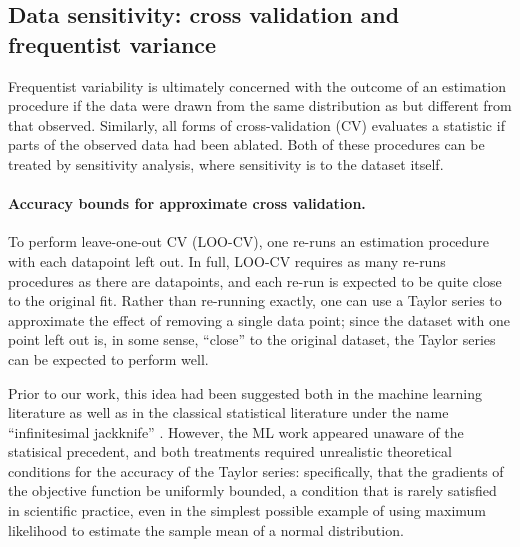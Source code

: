 

\subsection*{Data sensitivity: cross validation and frequentist variance}

Frequentist variability is ultimately concerned with the outcome of an
estimation procedure if the data were drawn from the same distribution as but
different from that observed.  Similarly, all forms of cross-validation (CV)
evaluates a statistic if parts of the observed data had been ablated.  Both of
these procedures can be treated by sensitivity analysis, where sensitivity
is to the dataset itself.

\paragraph{Accuracy bounds for approximate cross validation.}

To perform leave-one-out CV (LOO-CV), one re-runs an estimation procedure with
each datapoint left out.  In full, LOO-CV requires as many re-runs procedures as
there are datapoints, and each re-run is expected to be quite close to the
original fit.  Rather than re-running exactly, one can use a Taylor series to
approximate the effect of removing a single data point; since the dataset with
one point left out is, in some sense, ``close'' to the original dataset, the
Taylor series can be expected to perform well.

Prior to our work, this idea had been suggested both in the machine learning
literature \citep{rad:2018:scalableloo, koh:2017:blackbox} as well as in the
classical statistical literature under the name ``infinitesimal jackknife''
\citep{jaeckel:1972:infinitesimal, shao:2012:jackknife}.  However, the ML work
appeared unaware of the statisical precedent, and both treatments required
unrealistic theoretical conditions for the accuracy of the Taylor series:
specifically, that the gradients of the objective function be uniformly bounded,
a condition that is rarely satisfied in scientific practice, even in the
simplest possible example of using maximum likelihood to estimate the sample
mean of a normal distribution.

